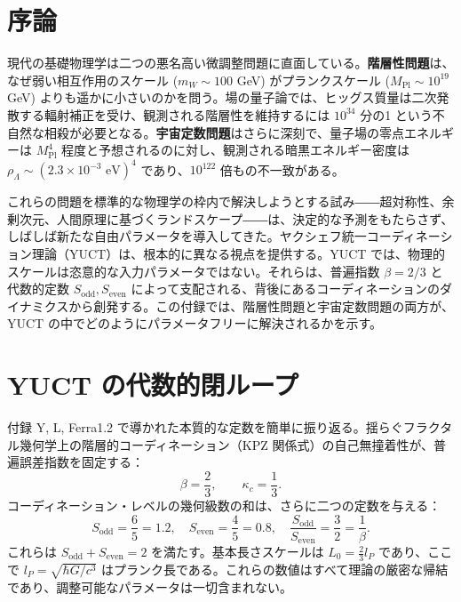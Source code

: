 \documentclass[11pt,a4paper]{article}
\theoremstyle{remark}
\begin{document}
	\section{序論}
	
	現代の基礎物理学は二つの悪名高い微調整問題に直面している。\textbf{階層性問題}は、なぜ弱い相互作用のスケール (\(m_W \sim 100\) GeV) がプランクスケール (\(M_{\mathrm{Pl}} \sim 10^{19}\) GeV) よりも遥かに小さいのかを問う。場の量子論では、ヒッグス質量は二次発散する輻射補正を受け、観測される階層性を維持するには \(10^{34}\) 分の1 という不自然な相殺が必要となる。\textbf{宇宙定数問題}はさらに深刻で、量子場の零点エネルギーは \(M_{\mathrm{Pl}}^4\) 程度と予想されるのに対し、観測される暗黒エネルギー密度は \(\rho_\Lambda \sim (2.3 \times 10^{-3} \text{ eV})^4\) であり、\(10^{122}\) 倍もの不一致がある。
	
	これらの問題を標準的な物理学の枠内で解決しようとする試み――超対称性、余剰次元、人間原理に基づくランドスケープ――は、決定的な予測をもたらさず、しばしば新たな自由パラメータを導入してきた。ヤクシェフ統一コーディネーション理論（YUCT）は、根本的に異なる視点を提供する。YUCT では、物理的スケールは恣意的な入力パラメータではない。それらは、普遍指数 \(\beta = 2/3\) と代数的定数 \(S_{\mathrm{odd}}, S_{\mathrm{even}}\) によって支配される、背後にあるコーディネーションのダイナミクスから創発する。この付録では、階層性問題と宇宙定数問題の両方が、YUCT の中でどのようにパラメータフリーに解決されるかを示す。
	
	\section{YUCT の代数的閉ループ}
	
	付録 Y, L, Ferra1.2 で導かれた本質的な定数を簡単に振り返る。揺らぐフラクタル幾何学上の階層的コーディネーション（KPZ 関係式）の自己無撞着性が、普遍誤差指数を固定する：
	\begin{equation}
		\beta = \frac{2}{3}, \qquad \kappa_c = \frac{1}{3}.
	\end{equation}
	コーディネーション・レベルの幾何級数の和は、さらに二つの定数を与える：
	\begin{equation}
		S_{\mathrm{odd}} = \frac{6}{5} = 1.2, \quad S_{\mathrm{even}} = \frac{4}{5} = 0.8, \quad \frac{S_{\mathrm{odd}}}{S_{\mathrm{even}}} = \frac{3}{2} = \frac{1}{\beta}.
	\end{equation}
	これらは \(S_{\mathrm{odd}} + S_{\mathrm{even}} = 2\) を満たす。基本長さスケールは \(L_0 = \frac{2}{3} l_P\) であり、ここで \(l_P = \sqrt{\hbar G / c^3}\) はプランク長である。これらの数値はすべて理論の厳密な帰結であり、調整可能なパラメータは一切含まれない。
	
\end{document}
